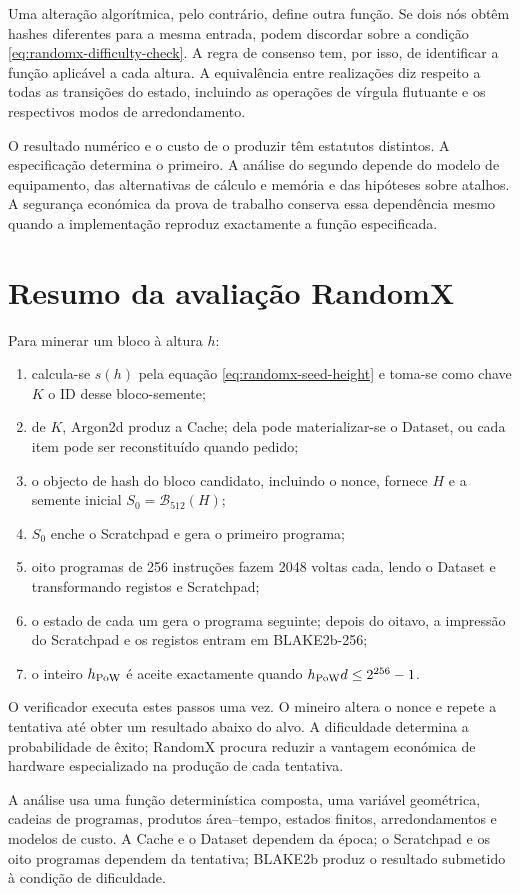Uma alteração algorítmica, pelo contrário, define outra função. Se dois nós
obtêm hashes diferentes para a mesma entrada, podem discordar sobre a
condição \eqref{eq:randomx-difficulty-check}. A regra de consenso tem, por
isso, de identificar a função aplicável a cada altura. A equivalência entre
realizações diz respeito a todas as transições do estado, incluindo as
operações de vírgula flutuante e os respectivos modos de arredondamento.

O resultado numérico e o custo de o produzir têm estatutos distintos. A
especificação determina o primeiro. A análise do segundo depende do modelo
de equipamento, das alternativas de cálculo e memória e das hipóteses sobre
atalhos. A segurança económica da prova de trabalho conserva essa dependência
mesmo quando a implementação reproduz exactamente a função especificada.

\section{Resumo da avaliação RandomX}
\label{sec:randomx-summary}

Para minerar um bloco à altura \(h\):
\begin{enumerate}
 \item calcula-se \(s(h)\) pela equação \eqref{eq:randomx-seed-height} e toma-se
 como chave \(K\) o ID desse bloco-semente;
 \item de \(K\), Argon2d produz a Cache; dela pode materializar-se o Dataset,
 ou cada item pode ser reconstituído quando pedido;
 \item o objecto de hash do bloco candidato, incluindo o nonce, fornece \(H\)
 e a semente inicial \(S_0=\mathcal B_{512}(H)\);
 \item \(S_0\) enche o Scratchpad e gera o primeiro programa;
 \item oito programas de 256 instruções fazem 2048 voltas cada, lendo o
 Dataset e transformando registos e Scratchpad;
 \item o estado de cada um gera o programa seguinte; depois do oitavo, a
 impressão do Scratchpad e os registos entram em BLAKE2b-256;
 \item o inteiro \(h_{\rm PoW}\) é aceite exactamente quando
 \(h_{\rm PoW}d\leq2^{256}-1\).
\end{enumerate}

O verificador executa estes passos uma vez. O mineiro altera o nonce e repete a
tentativa até obter um resultado abaixo do alvo. A dificuldade determina a
probabilidade de êxito; RandomX procura reduzir a vantagem económica de
hardware especializado na produção de cada tentativa.

A análise usa uma função determinística composta, uma variável geométrica,
cadeias de programas, produtos área--tempo, estados finitos, arredondamentos e
modelos de custo. A Cache e o Dataset dependem da época; o Scratchpad e os oito
programas dependem da tentativa; BLAKE2b produz o resultado submetido à
condição de dificuldade.

\label{page:randomx-end}
